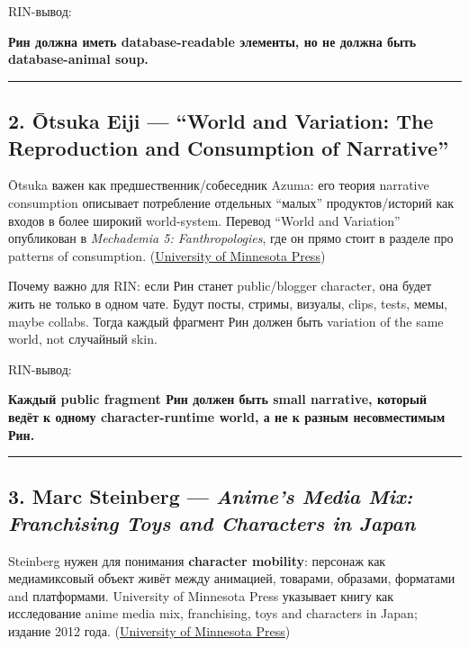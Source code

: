RIN-вывод:

\textbf{Рин должна иметь database-readable элементы, но не должна быть
database-animal soup.}

\begin{center}\rule{0.5\linewidth}{0.5pt}\end{center}

\subsection*{2. Ōtsuka Eiji --- ``World and Variation: The Reproduction
and Consumption of Narrative''}

Ōtsuka важен как предшественник/\hspace{0pt}собеседник Azuma: его теория narrative
consumption описывает потребление отдельных ``малых'' продуктов/\hspace{0pt}историй
как входов в более широкий world-system. Перевод ``World and Variation''
опубликован в \emph{Mechademia 5: Fanthropologies}, где он прямо стоит в
разделе про patterns of consumption.
(\href{https://www.upress.umn.edu/9781452915654/mechademia-5/?utm_source=chatgpt.com}{University
of Minnesota Press})

Почему важно для RIN: если Рин станет public/\hspace{0pt}blogger character, она
будет жить не только в одном чате. Будут посты, стримы, визуалы, clips,
tests, мемы, maybe collabs. Тогда каждый фрагмент Рин должен быть
variation of the same world, not случайный skin.

RIN-вывод:

\textbf{Каждый public fragment Рин должен быть small narrative, который
ведёт к одному character-runtime world, а не к разным несовместимым
Рин.}

\begin{center}\rule{0.5\linewidth}{0.5pt}\end{center}

\subsection*{\texorpdfstring{3. Marc Steinberg --- \emph{Anime's Media
Mix: Franchising Toys and Characters in
Japan}}{3. Marc Steinberg --- Anime's Media Mix: Franchising Toys and Characters in Japan}}

Steinberg нужен для понимания \textbf{character mobility}: персонаж как
медиамиксовый объект живёт между анимацией, товарами, образами,
форматами and платформами. University of Minnesota Press указывает книгу
как исследование anime media mix, franchising, toys and characters in
Japan; издание 2012 года.
(\href{https://www.upress.umn.edu/9780816675500/animes-media-mix/?utm_source=chatgpt.com}{University
of Minnesota Press})

